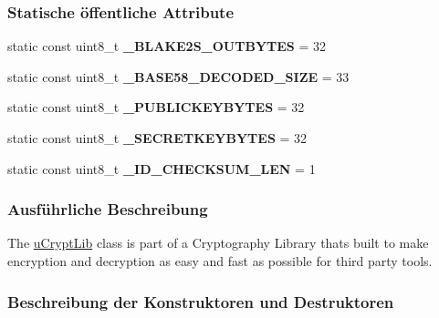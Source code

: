 \subsubsection*{Statische öffentliche Attribute}
\begin{DoxyCompactItemize}
\item 
\hypertarget{classuCrypt_1_1uCryptLib_a5fa4bf355e7d158cb8caffd8a1b71340}{}static const uint8\+\_\+t {\bfseries \+\_\+\+B\+L\+A\+K\+E2\+S\+\_\+\+O\+U\+T\+B\+Y\+T\+E\+S} = 32\label{classuCrypt_1_1uCryptLib_a5fa4bf355e7d158cb8caffd8a1b71340}

\item 
\hypertarget{classuCrypt_1_1uCryptLib_a67cf7ad1aa88ca33fcbbd0cc7fb01331}{}static const uint8\+\_\+t {\bfseries \+\_\+\+B\+A\+S\+E58\+\_\+\+D\+E\+C\+O\+D\+E\+D\+\_\+\+S\+I\+Z\+E} = 33\label{classuCrypt_1_1uCryptLib_a67cf7ad1aa88ca33fcbbd0cc7fb01331}

\item 
\hypertarget{classuCrypt_1_1uCryptLib_a978672f063403a89fb8de70d87c0098a}{}static const uint8\+\_\+t {\bfseries \+\_\+\+P\+U\+B\+L\+I\+C\+K\+E\+Y\+B\+Y\+T\+E\+S} = 32\label{classuCrypt_1_1uCryptLib_a978672f063403a89fb8de70d87c0098a}

\item 
\hypertarget{classuCrypt_1_1uCryptLib_a1b78ba33d66a667292e64208c9e4a484}{}static const uint8\+\_\+t {\bfseries \+\_\+\+S\+E\+C\+R\+E\+T\+K\+E\+Y\+B\+Y\+T\+E\+S} = 32\label{classuCrypt_1_1uCryptLib_a1b78ba33d66a667292e64208c9e4a484}

\item 
\hypertarget{classuCrypt_1_1uCryptLib_aad847c31cdc5b0162f2245389ca9d540}{}static const uint8\+\_\+t {\bfseries \+\_\+\+I\+D\+\_\+\+C\+H\+E\+C\+K\+S\+U\+M\+\_\+\+L\+E\+N} = 1\label{classuCrypt_1_1uCryptLib_aad847c31cdc5b0162f2245389ca9d540}

\end{DoxyCompactItemize}


\subsubsection{Ausführliche Beschreibung}
The \hyperlink{classuCrypt_1_1uCryptLib}{u\+Crypt\+Lib} class is part of a Cryptography Library that\textquotesingle{}s built to make encryption and decryption as easy and fast as possible for third party tools. 

\subsubsection{Beschreibung der Konstruktoren und Destruktoren}
\hypertarget{classuCrypt_1_1uCryptLib_a87345999d9b68b3e116e091f5d5b1e80}{}
